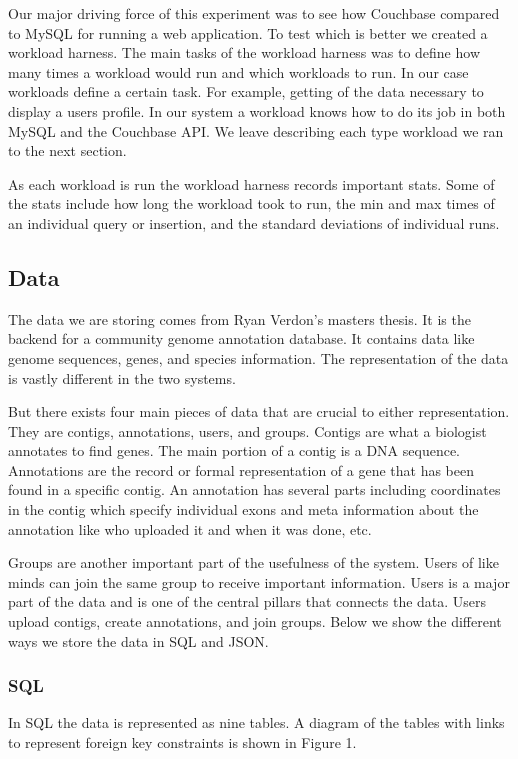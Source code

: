 \documentclass[]{IEEEtran}
\begin{document}
Our major driving force of this experiment was to see how Couchbase compared to
MySQL for running a web application. To test which is better we created a
workload harness. The main tasks of the workload harness was to define how many
times a workload would run and which workloads to run. In our case workloads
define a certain task. For example, getting of the data necessary to display a
users profile. In our system a workload knows how to do its job in both MySQL
and the Couchbase API. We leave describing each type workload we ran to the
next section.

As each workload is run the workload harness records important stats. Some of
the stats include how long the workload took to run, the min and max times of
an individual query or insertion, and the standard deviations of individual
runs.

\subsection{Data}
The data we are storing comes from Ryan Verdon's masters thesis. It is the
backend for a community genome annotation database. It contains data like
genome sequences, genes, and species information. The representation of the
data is vastly different in the two systems. 

But there exists four main pieces of data that are crucial to either
representation. They are contigs, annotations, users, and groups. Contigs are
what a biologist annotates to find genes. The main portion of a contig is a DNA
sequence. Annotations are the record or formal representation of a gene that
has been found in a specific contig. An annotation has several parts including
coordinates in the contig which specify individual exons and meta information
about the annotation like who uploaded it and when it was done, etc. 

Groups are another important part of the usefulness of the system. Users of
like minds can join the same group to receive important information. Users is a
major part of the data and is one of the central pillars that connects the
data. Users upload contigs, create annotations, and join groups. Below we show
the different ways we store the data in SQL and JSON.

\subsubsection{SQL}
In SQL the data is represented as nine tables. A diagram of the tables with
links to represent foreign key constraints is shown in Figure 1. 
\end{document}
